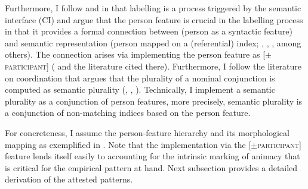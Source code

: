 \documentclass[output=paper,modfontsnewtxmath,hidelinks]{langscibook}
\begin{document}
Furthermore, I follow \citet{Narita2011} and \citet{Chomsky2013} in that labelling is a process triggered by the semantic interface (CI) and argue that the person feature is crucial in the labelling process in that it provides a formal connection between  (person as a syntactic feature) and semantic representation (person mapped on a (referential) index; \citealt{Longobardi2008}, \citealt{Sudo2012}, \citealt{Landau2010}, among others). The connection arises via implementing the person feature as [$\pm$\textsc{participant}] (\cite{Nevins2007} and the literature cited there). Furthermore, I follow the literature on coordination that argues that the plurality of a nominal conjunction is computed as semantic plurality (\citealt{Munn1993}, \citealt{Bošković2009}, \citealt{bhattwalkow13}). Technically, I implement a semantic plurality as a conjunction of person features, more precisely, semantic plurality is a conjunction of non-matching indices based on the person feature. 

For concreteness, I assume the person-feature hierarchy and its morphological mapping as exemplified in . 
Note that the implementation via the [$\pm$\textsc{participant}] feature lends itself easily to accounting for the intrinsic marking of animacy that is critical for the empirical pattern at hand. Next subsection provides a detailed derivation of the attested patterns.
\end{document}
